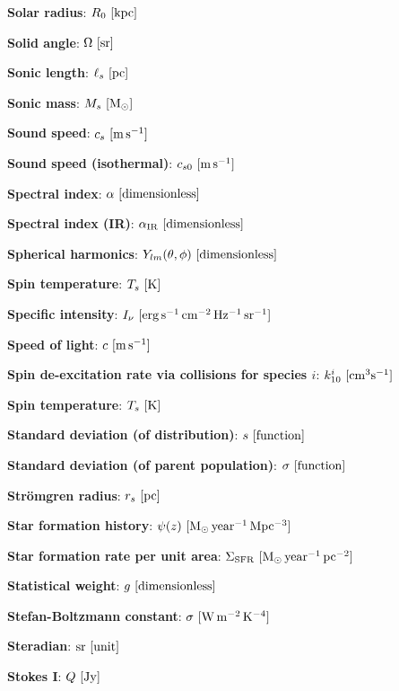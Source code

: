 \documentclass[a4paper,10pt]{article}
\begin{document}
{\noindent}\textbf{Solar radius}: $R_0 ~ [{\rm kpc}]$

{\noindent}\textbf{Solid angle}: $\Omega ~ [{\rm sr}]$

{\noindent}\textbf{Sonic length}: $\ell_s ~ [{\rm pc}]$

{\noindent}\textbf{Sonic mass}: $M_s ~ [{\rm M_\odot}]$

{\noindent}\textbf{Sound speed}: $c_s ~ [{\rm m\,s^{-1}}]$

{\noindent}\textbf{Sound speed (isothermal)}: $c_{s0} ~ [{\rm m\,s^{-1}}]$

{\noindent}\textbf{Spectral index}: $\alpha ~ [{\rm dimensionless}]$

{\noindent}\textbf{Spectral index (IR)}: $\alpha_{\rm IR} ~ [{\rm dimensionless}]$

{\noindent}\textbf{Spherical harmonics}: $Y_{lm}(\theta,\phi) ~ [{\rm dimensionless}]$

{\noindent}\textbf{Spin temperature}: $T_s ~ [{\rm K}]$

{\noindent}\textbf{Specific intensity}: $I_\nu ~ [{\rm erg\,s^{-1}\,cm^{-2}\,Hz^{-1}\,sr^{-1}}]$

{\noindent}\textbf{Speed of light}: $c ~ [{\rm m\,s^{-1}}]$

{\noindent}\textbf{Spin de-excitation rate via collisions for species $i$}: $k_{10}^i ~ [{\rm cm^3s^{-1}}]$

{\noindent}\textbf{Spin temperature}: $T_s ~ [{\rm K}]$

{\noindent}\textbf{Standard deviation (of distribution)}: $s ~ [{\rm function}]$

{\noindent}\textbf{Standard deviation (of parent population)}: $\sigma ~ [{\rm function}]$

{\noindent}\textbf{Str\"omgren radius}: $r_s ~ [{\rm pc}]$

{\noindent}\textbf{Star formation history}: $\psi(z) ~ [{\rm M_\odot\,year^{-1}\,Mpc^{-3}}]$

{\noindent}\textbf{Star formation rate per unit area}: $\Sigma_\mathrm{SFR} ~ [{\rm M_\odot\,year^{-1}\,pc^{-2}}]$

{\noindent}\textbf{Statistical weight}: $g ~ [{\rm dimensionless}]$

{\noindent}\textbf{Stefan-Boltzmann constant}: $\sigma ~ [{\rm W\,m^{-2}\,K^{-4}}]$

{\noindent}\textbf{Steradian}: ${\rm sr} ~ [{\rm unit}]$

{\noindent}\textbf{Stokes I}: $Q ~ [{\rm Jy}]$
\end{document}
